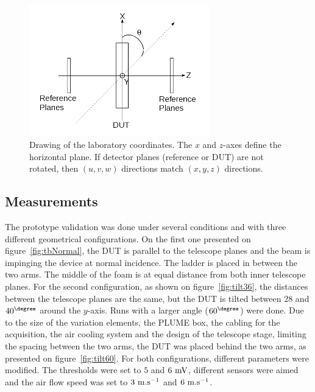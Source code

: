     \begin{figure}[!h]
      \centering
      \includegraphics[width = 0.7\textwidth]{Pictures/deformation/lab_frame.png}
      \caption{Drawing of the laboratory coordinates. The $x$ and $z$-axes define the horizontal plane. If detector planes (reference or DUT) are not rotated, then $(u,v,w)$ directions match $(x,y,z)$ directions.}
      \label{fig:labCoordinates}
    \end{figure}

    \subsection{Measurements}

    The prototype validation was done under several conditions and with three different geometrical configurations.
    On the first one presented on figure~\ref{fig:tbNormal}, the \gls{DUT} is parallel to the telescope planes and the beam is impinging the device at normal incidence.
    The ladder is placed in between the two arms.
    The middle of the foam is at equal distance from both inner telescope planes.
    For the second configuration, as shown on figure~\ref{fig:tilt36}, the distances between the telescope planes are the same, but the \gls{DUT} is tilted between $28$ and $40^{\degree}$ around the $y$-axis.
    Runs with a larger angle ($60^{\degree}$) were done.
    Due to the size of the variation elements, the \gls{PLUME} box, the cabling for the acquisition, the air cooling system and the design of the telescope stage, limiting the spacing between the two arms, the \gls{DUT} was placed behind the two arms, as presented on figure~\ref{fig:tilt60}.
    For both configurations, different parameters were modified.
    The thresholds were set to $5$ and $6~\rm{mV}$, different sensors were aimed and the air flow speed was set to $3~\rm{m.s}^{-1}$ and $6~\rm{m.s}^{-1}$.

